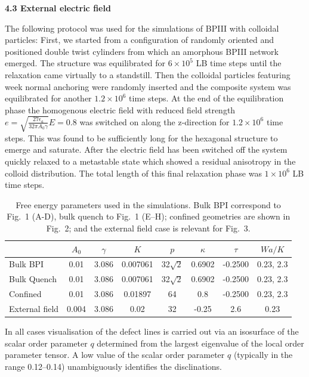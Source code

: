 \documentclass[12pt,twoside]{article}
\begin{document}
{\bf 4.3 External electric field}

The following protocol was used for the simulations of BPIII with
colloidal particles: First, we started from a configuration of
randomly oriented and positioned double twist cylinders from which an
amorphous BPIII network emerged. The structure
was equilibrated for $6\times10^{5}$ LB time steps until the relaxation came
virtually to a standstill. Then the colloidal particles featuring week
normal anchoring were randomly inserted and the composite system was
equilibrated for another $1.2\times10^{6}$ time steps.
At the end of the equilibration phase the homogenous electric field
with reduced field strength $e=\sqrt{\frac{27\epsilon_a}{32\pi A_0\gamma}} E=0.8$ 
was switched on along the z-direction for $1.2\times10^{6}$ time steps.
This was found to be sufficiently long for the hexagonal structure to emerge and saturate.
After the electric field has been switched off the system quickly relaxed
to a metastable state which showed a residual anisotropy in the
colloid distribution. The total length of this final relaxation phase
was $1\times10^6$ LB time steps.

\begin{table}
\begin{center}
\begin{tabular}{|l|c|c|c|c|c|c|c|}
\hline
         & $A_0$ & $\gamma$ & $K$ & $p$ & $\kappa$ & $\tau$ & $Wa/K$\\
\hline 
Bulk BPI & 0.01 & 3.086 & 0.007061 & 32$\sqrt{2}$ & 0.6902 & -0.2500 &
0.23, 2.3\\
\hline
Bulk Quench & 0.01 & 3.086 & 0.007061 & 32$\sqrt{2}$ & 0.6902 & -0.2500 &
0.23, 2.3 \\
\hline
Confined & 0.01 & 3.086 & 0.01897 & 64 & 0.8 & -0.2500 & 0.23, 2.3\\
\hline
External field & 0.004& 3.086 & 0.02 & 32 & -0.25 & 2.6 & 0.23\\ 
\hline
\end{tabular}
\end{center}
\caption{Free energy parameters used in the simulations. Bulk BPI
correspond to Fig.~1 (A-D), bulk quench to Fig.~1 (E--H); confined
geometries are shown in Fig.~2; and the external field case is
relevant for Fig.~3.}
\label{table:params}
\end{table}

In all cases visualisation of the defect lines is carried out via
an isosurface of the scalar order parameter $q$ determined from the
largest eigenvalue of the local order parameter tensor. A low value
of the scalar order parameter $q$ (typically in the range 0.12--0.14)
unambiguously identifies the disclinations.
\end{document}
